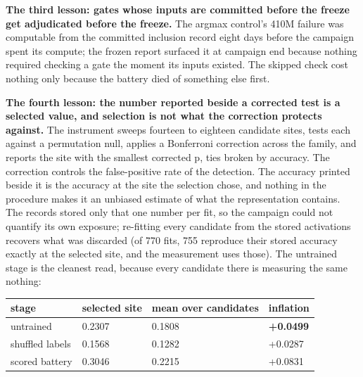 \textbf{The third lesson: gates whose inputs are committed before the freeze
get adjudicated before the freeze.} The argmax control's 410M failure
was computable from the committed inclusion record eight days before
the campaign spent its compute; the frozen report surfaced it at
campaign end because nothing required checking a gate the moment its
inputs existed. The skipped check cost nothing only because the
battery died of something else first.

\textbf{The fourth lesson: the number reported beside a corrected test is a
selected value, and selection is not what the correction protects
against.} The instrument sweeps fourteen to eighteen candidate sites,
tests each against a permutation null, applies a Bonferroni correction
across the family, and reports the site with the smallest corrected p,
ties broken by accuracy. The correction controls the false-positive
rate of the detection. The accuracy printed beside it is the accuracy
at the site the selection chose, and nothing in the procedure makes it
an unbiased estimate of what the representation contains. The records
stored only that one number per fit, so the campaign could not
quantify its own exposure; re-fitting every candidate from the stored
activations recovers what was discarded (of 770 fits, 755 reproduce
their stored accuracy exactly at the selected site, and the
measurement uses those). The untrained stage is the cleanest read,
because every candidate there is measuring the same nothing:

\begin{longtable}[]{@{}llll@{}}
\toprule\noalign{}
stage & selected site & mean over candidates & inflation \\
\midrule\noalign{}
\endhead
\bottomrule\noalign{}
\endlastfoot
untrained & 0.2307 & 0.1808 & \textbf{+0.0499} \\
shuffled labels & 0.1568 & 0.1282 & +0.0287 \\
scored battery & 0.3046 & 0.2215 & +0.0831 \\
\end{longtable}

